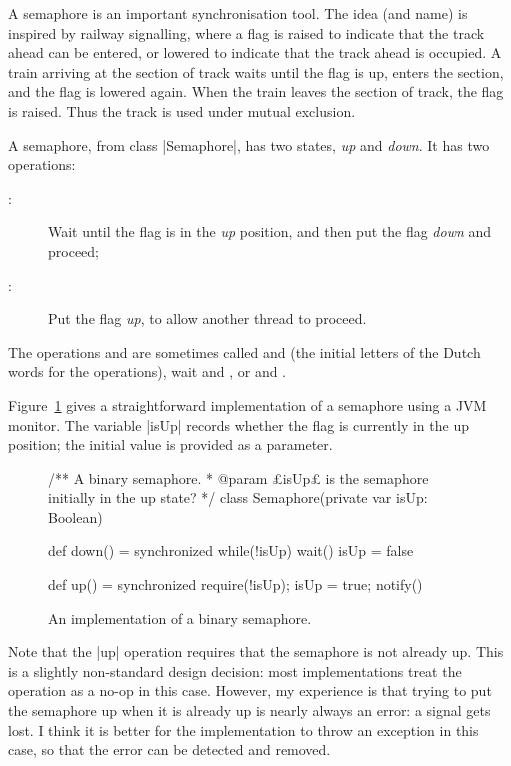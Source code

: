 A semaphore is an important synchronisation tool.  The idea
(and name) is inspired by railway signalling, where a flag is raised to
indicate that the track ahead can be entered, or lowered to indicate that the
track ahead is occupied.  A train arriving at the section of track waits until
the flag is up, enters the section, and the flag is lowered again.  When the
train leaves the section of track, the flag is raised.  Thus the track is used
under mutual exclusion.

A semaphore, from class |Semaphore|, has two
states, \emph{up} and \emph{down}.  It has two operations: 
%
\begin{description}
\item[:] Wait until the flag is in
the \emph{up} position, and then put the flag \emph{down} and proceed;

\item[:] Put the flag \emph{up}, to allow
another thread to proceed.
\end{description}
%
The operations  and  are sometimes called  and
 (the initial letters of the Dutch words for the operations),
{\scalastyle wait} and , or  and
.

Figure~\ref{fig:semaphore-implementation} gives a straightforward
implementation of a semaphore using a JVM monitor.  The variable |isUp|
records whether the flag is currently in the up position; the initial value is
provided as a parameter.


\begin{figure}
\begin{scala}
/** A binary semaphore.
  * @param £isUp£ is the semaphore initially in the up state? */
class Semaphore(private var isUp: Boolean){
  def down() = synchronized{
    while(!isUp) wait()
    isUp = false
  }

  def up() = synchronized{
    require(!isUp); isUp = true; notify()
  }
}
\end{scala}
\caption{An implementation of a binary semaphore.}
\label{fig:semaphore-implementation}
\end{figure}

Note that the |up| operation requires that the semaphore is not already up.
This is a slightly non-standard design decision: most implementations treat
the operation as a no-op in this case.  However, my experience is that trying
to put the semaphore up when it is already up is nearly always an error: a
signal gets lost.  I think it is better for the implementation to throw an
exception in this case, so that the error can be detected and removed.

